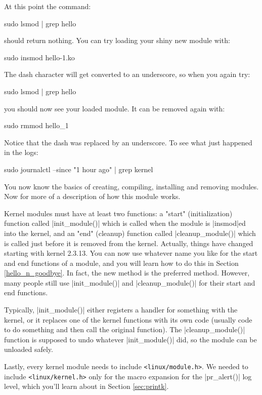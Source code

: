 \documentclass[10pt, oneside]{book}
\begin{document}
At this point the command:
\begin{codebash}
sudo lsmod | grep hello
\end{codebash}

should return nothing.
You can try loading your shiny new module with:
\begin{codebash}
sudo insmod hello-1.ko
\end{codebash}

The dash character will get converted to an underscore, so when you again try:
\begin{codebash}
sudo lsmod | grep hello
\end{codebash}

you should now see your loaded module. It can be removed again with:
\begin{codebash}
sudo rmmod hello_1
\end{codebash}

Notice that the dash was replaced by an underscore.
To see what just happened in the logs:
\begin{codebash}
sudo journalctl --since "1 hour ago" | grep kernel
\end{codebash}

You now know the basics of creating, compiling, installing and removing modules.
Now for more of a description of how this module works.

Kernel modules must have at least two functions: a "start" (initialization) function called \cpp|init_module()| which is called when the module is \sh|insmod|ed into the kernel, and an "end" (cleanup) function called \cpp|cleanup_module()| which is called just before it is removed from the kernel.
Actually, things have changed starting with kernel 2.3.13.
You can now use whatever name you like for the start and end functions of a module, and you will learn how to do this in Section \ref{hello_n_goodbye}.
In fact, the new method is the preferred method.
However, many people still use \cpp|init_module()| and \cpp|cleanup_module()| for their start and end functions.

Typically, \cpp|init_module()| either registers a handler for something with the kernel, or it replaces one of the kernel functions with its own code (usually code to do something and then call the original function).
The \cpp|cleanup_module()| function is supposed to undo whatever \cpp|init_module()| did, so the module can be unloaded safely.

Lastly, every kernel module needs to include \verb|<linux/module.h>|.
We needed to include \verb|<linux/kernel.h>| only for the macro expansion for the \cpp|pr_alert()| log level, which you'll learn about in Section \ref{sec:printk}.
\end{document}
